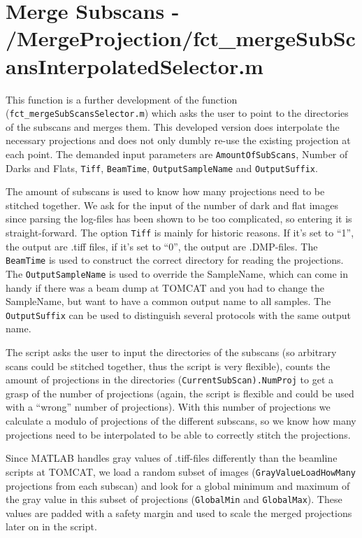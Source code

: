 \documentclass[a4paper]{scrartcl}
\begin{document}


\section[Merge Subscans]{Merge Subscans - /MergeProjection/fct_mergeSubScansInterpolatedSelector.m}
This function is a further development of the function (\verb+fct_mergeSubScansSelector.m+) which asks the user to point to the directories of the subscans and merges them. This developed version does interpolate the necessary projections and does not only dumbly re-use the existing projection at each point. The demanded input parameters are \verb+AmountOfSubScans+, Number of Darks and Flats, \verb+Tiff+, \verb+BeamTime+, \verb+OutputSampleName+ and \verb+OutputSuffix+.

The amount of subscans is used to know how many projections need to be stitched together. We ask for the input of the number of dark and flat images since parsing the log-files has been shown to be too complicated, so entering it is straight-forward. The option \verb+Tiff+ is mainly for historic reasons. If it's set to ``1'', the output are .tiff files, if it's set to ``0'', the output are .DMP-files. The \verb+BeamTime+ is used to construct the correct directory for reading the projections. The \verb+OutputSampleName+ is used to override the SampleName, which can come in handy if there was a beam dump at TOMCAT and you had to change the SampleName, but want to have a common output name to all samples. The \verb+OutputSuffix+ can be used to distinguish several protocols with the same output name. 

The script asks the user to input the directories of the subscans (so arbitrary scans could be stitched together, thus the script is very flexible), counts the amount of projections in the directories (\verb+CurrentSubScan).NumProj+ to get a grasp of the number of projections (again, the script is flexible and could be used with a ``wrong'' number of projections). With this number of projections we calculate a modulo of projections of the different subscans, so we know how many projections need to be interpolated to be able to correctly stitch the projections.

Since MATLAB handles gray values of .tiff-files differently than the beamline scripts at TOMCAT, we load a random subset of images (\verb+GrayValueLoadHowMany+ projections from each subscan) and look for a global minimum and maximum of the gray value in this subset of projections (\verb+GlobalMin+ and \verb+GlobalMax+). These values are padded with a safety margin and used to scale the merged projections later on in the script.
\end{document}
